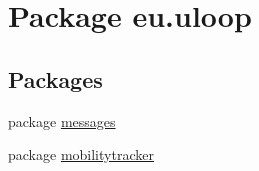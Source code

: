 \hypertarget{namespaceeu_1_1uloop}{\section{Package eu.\+uloop}
\label{namespaceeu_1_1uloop}
}
\subsection*{Packages}
\begin{DoxyCompactItemize}
\item 
package \hyperlink{namespaceeu_1_1uloop_1_1messages}{messages}
\item 
package \hyperlink{namespaceeu_1_1uloop_1_1mobilitytracker}{mobilitytracker}
\end{DoxyCompactItemize}
